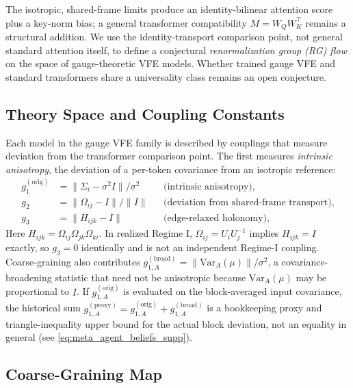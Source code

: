 \documentclass[twoside,11pt]{article}
\begin{document}
The isotropic, shared-frame limits produce an identity-bilinear attention score plus a key-norm bias; a general transformer compatibility $M=W_QW_K^\top$ remains a structural addition. We use the identity-transport comparison point, not general standard attention itself, to define a conjectural \emph{renormalization group (RG) flow} on the space of gauge-theoretic VFE models. Whether trained gauge VFE and standard transformers share a universality class remains an open conjecture.

\subsection{Theory Space and Coupling Constants}

Each model in the gauge VFE family is described by couplings that measure deviation from the transformer comparison point. The first measures \emph{intrinsic anisotropy}, the deviation of a per-token covariance from an isotropic reference:
\begin{align}
g_1^{(\mathrm{orig})} &= \|\Sigma_i - \sigma^2 I\| / \sigma^2 & &\text{(intrinsic anisotropy)}, \label{eq:g1_def_supp} \\
g_2 &= \|\Omega_{ij} - I\| / \|I\| & &\text{(deviation from shared-frame transport)}, \label{eq:g2_def_supp} \\
g_3 &= \|H_{ijk} - I\| & &\text{(edge-relaxed holonomy)}, \label{eq:g3_def_supp}
\end{align}
Here $H_{ijk}=\Omega_{ij}\Omega_{jk}\Omega_{ki}$. In realized Regime I, $\Omega_{ij}=U_iU_j^{-1}$ implies $H_{ijk}=I$ exactly, so $g_3=0$ identically and is not an independent Regime-I coupling. Coarse-graining also contributes $g_{1,A}^{(\mathrm{broad})}=\|\mathrm{Var}_A(\mu)\|/\sigma^2$, a covariance-broadening statistic that need not be anisotropic because $\mathrm{Var}_A(\mu)$ may be proportional to $I$. If $g_{1,A}^{(\mathrm{orig})}$ is evaluated on the block-averaged input covariance, the historical sum $g_{1,A}^{(\mathrm{proxy})}=g_{1,A}^{(\mathrm{orig})}+g_{1,A}^{(\mathrm{broad})}$ is a bookkeeping proxy and triangle-inequality upper bound for the actual block deviation, not an equality in general (see \eqref{eq:meta_agent_beliefs_supp}).

\subsection{Coarse-Graining Map}
\end{document}
